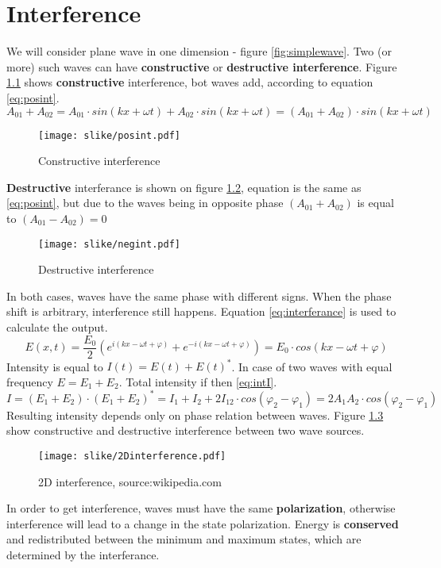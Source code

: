 \chapter{Interference}
We will consider plane wave in one dimension - figure \ref{fig:simplewave}.
Two (or more) such waves can have \textbf{constructive} or \textbf{destructive interference}.
Figure \ref{fig:posint} shows \textbf{constructive} interference, bot waves add, according to equation \ref{eq:posint}.
\begin{equation}
    A_{01} + A_{02}  = A_{01} \cdot sin(kx + \omega t) + A_{02} \cdot sin(kx + \omega t) = (A_{01}+ A_{02}) \cdot sin(kx + \omega t)
    \label{eq:posint}
\end{equation}
\begin{figure}[h!]
    \centering
    \texttt{[image: slike/posint.pdf]}
    \caption{Constructive interference}
    \label{fig:posint}
\end{figure}

\textbf{Destructive} interferance is shown on figure \ref{fig:negint}, equation is the same as \ref{eq:posint}, but due to the waves being in opposite phase
$(A_{01}+ A_{02})$ is equal to $(A_{01} - A_{02}) = 0$
\begin{figure}[h!]
    \centering
    \texttt{[image: slike/negint.pdf]}
    \caption{Destructive interference}
    \label{fig:negint}
\end{figure}

In both cases, waves have the same phase with different signs. When the phase shift is arbitrary,
interference still happens. 
Equation \ref{eq:interferance} is used to calculate the output.
\begin{equation}
    E(x,t) = \frac{E_0}{2} (e^{i(kx - \omega t + \varphi)} + e^{-i(kx - \omega t + \varphi)}) = E_0 \cdot cos(kx - \omega t + \varphi)
    \label{eq:interferance}
\end{equation}
Intensity is equal to $I(t) = E(t) + E(t)^*$. In case of two waves with equal frequency $E = E_1 + E_2$.
Total intensity if then \ref{eq:intI}.
\begin{equation}
    I = (E_1 + E_2) \cdot (E_1 + E_2)^* = I_1 + I_2 + 2 I_{12}\cdot cos(\varphi_2 - \varphi_1) = 2 A_1 A_2 \cdot cos(\varphi_2 - \varphi_1)
    \label{eq:intI}
\end{equation}
Resulting intensity depends only on phase relation between waves.  Figure \ref{fig:2Dint} show constructive and destructive interference between two 
wave sources.

\begin{figure}[h!]
    \centering
    \texttt{[image: slike/2Dinterference.pdf]}
    \caption{2D interference, source:wikipedia.com}
    \label{fig:2Dint}
\end{figure}

In order to get interference, waves must have the same \textbf{polarization}, otherwise interference will lead to a change in the state polarization.
Energy is \textbf{conserved} and redistributed between the minimum and maximum states, which are determined by the interferance.

